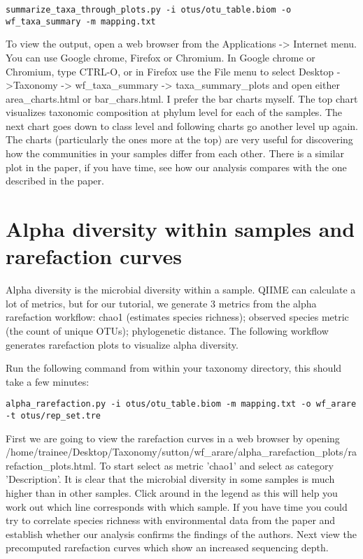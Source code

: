 \begin{steps}

\begin{lstlisting}[style=command_syntax]
summarize_taxa_through_plots.py -i otus/otu_table.biom -o  wf_taxa_summary -m mapping.txt 

\end{lstlisting}
\end{steps}

\begin{steps}
To view the output, open a web browser from the Applications -> Internet menu. You can use Google chrome, Firefox or Chromium.
In Google chrome or Chromium, type CTRL-O, or in Firefox use the File menu to select Desktop ->Taxonomy -> wf\_taxa\_summary -> taxa\_summary\_plots and open either area\_charts.html or bar\_chars.html. I prefer the bar charts myself. The top chart visualizes taxonomic composition at phylum level for each of the samples. The next chart goes down to class level and following charts go another level up again. The charts (particularly the ones more at the top) are very useful for discovering how the communities in your samples differ from each other. There is a similar plot in the paper, if you have time, see how our analysis compares with the one described in the paper.

\end{steps}

\section{Alpha diversity within samples and rarefaction curves}

Alpha diversity is the microbial diversity within a sample. QIIME can calculate a lot of metrics, but for our tutorial, we generate 3 metrics from the alpha rarefaction workflow: chao1 (estimates species richness); observed species metric (the count of unique OTUs); phylogenetic distance. The following workflow generates rarefaction plots to visualize alpha diversity.

\begin{steps}
Run the following command from within your taxonomy directory, this should take a few minutes:
\begin{lstlisting}
alpha_rarefaction.py -i otus/otu_table.biom -m mapping.txt -o wf_arare -t otus/rep_set.tre
\end{lstlisting}
\end{steps}

First we are going to view the rarefaction curves in a web browser by opening /home/trainee/Desktop/Taxonomy/sutton/wf\_arare/alpha\_rarefaction\_plots/rarefaction\_plots.html. 
To start select as metric 'chao1' and select as category 'Description'. It is clear that the microbial diversity in some samples is much higher than in other samples. Click around in the legend as this will help you work out which line corresponds with which sample. If you have time you could try to correlate species richness with environmental data from the paper and establish whether our analysis confirms the findings of the authors.
Next view the precomputed rarefaction curves which show an increased sequencing depth.

